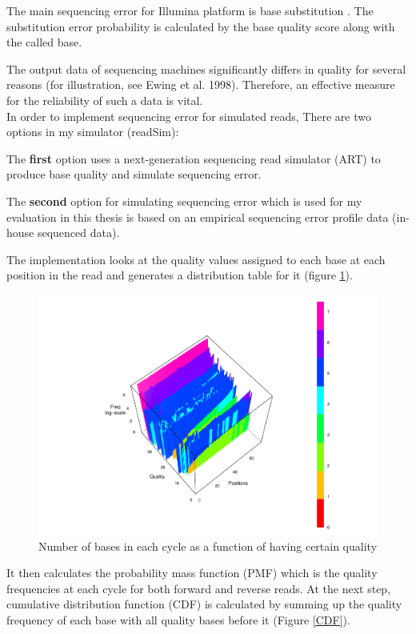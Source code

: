 \documentclass[11pt,a4paper]{report}
\begin{document}
The main sequencing error for Illumina platform is base substitution 
\cite{art}. The substitution error probability is calculated by the 
base quality score along with the called base.

The output data of sequencing machines significantly differs in quality for 
several reasons (for illustration, see Ewing et al. 1998).  Therefore, an 
effective measure for the reliability of such a data is vital\cite{phred1}.\\


In order to implement sequencing error for simulated reads, There are two
options in my simulator (readSim):

The \textbf{first} option uses a next-generation sequencing read simulator 
(ART) to produce base quality and simulate sequencing error.


The \textbf{second} option for simulating sequencing error which is used for
my evaluation in this thesis is based on an empirical sequencing error profile 
data (in-house sequenced data).

The implementation looks at the quality values assigned to each base at each
position in the read and generates a distribution table for it (figure \ref{hist}).

\begin{figure}[H]
\centering
\includegraphics[width=12cm]{pictures/3Dplot.pdf}
\caption{Number of bases in each cycle as a function of having certain quality}
\label{hist}
\end{figure}

It then calculates the probability mass function (PMF) which is the quality 
frequencies at each cycle for both forward and reverse reads. At the next 
step, cumulative distribution function (CDF) is calculated by summing up the 
quality frequency of each base with all quality bases before it (Figure \ref{CDF}).
\end{document}
